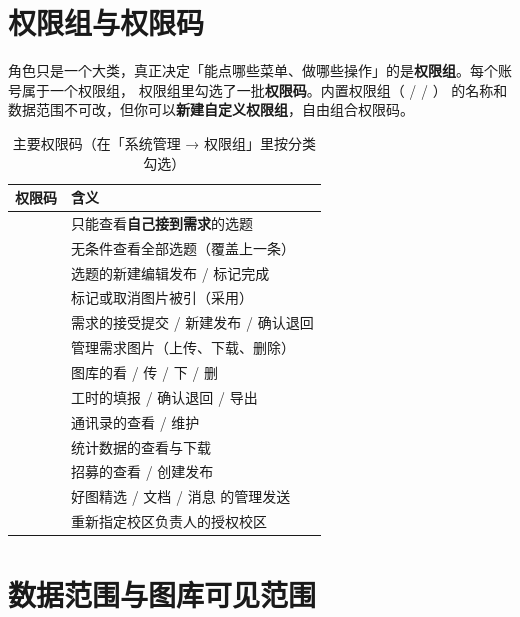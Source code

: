 \documentclass[cn,11pt,green]{elegantbook}
\begin{document}
\section{权限组与权限码}

角色只是一个大类，真正决定「能点哪些菜单、做哪些操作」的是\textbf{权限组}。每个账号属于一个权限组，
权限组里勾选了一批\textbf{权限码}。内置权限组（ /  / ）
的名称和数据范围不可改，但你可以\textbf{新建自定义权限组}，自由组合权限码。

\begin{table}[htbp]
  \centering
  \caption{主要权限码（在「系统管理 → 权限组」里按分类勾选）}
  \begin{tabular}{L{4.8cm} L{7.6cm}}
    \toprule
    \textbf{权限码} & \textbf{含义} \\
    \midrule
     & 只能查看\textbf{自己接到需求}的选题 \\
     & 无条件查看全部选题（覆盖上一条） \\
     & 选题的新建编辑发布 / 标记完成 \\
     & 标记或取消图片被引（采用） \\
     & 需求的接受提交 / 新建发布 / 确认退回 \\
     & 管理需求图片（上传、下载、删除） \\
     & 图库的看 / 传 / 下 / 删 \\
     & 工时的填报 / 确认退回 / 导出 \\
     & 通讯录的查看 / 维护 \\
     & 统计数据的查看与下载 \\
     & 招募的查看 / 创建发布 \\
     & 好图精选 / 文档 / 消息 的管理发送 \\
     & 重新指定校区负责人的授权校区 \\
    \bottomrule
  \end{tabular}
\end{table}

\section{数据范围与图库可见范围}
\end{document}
